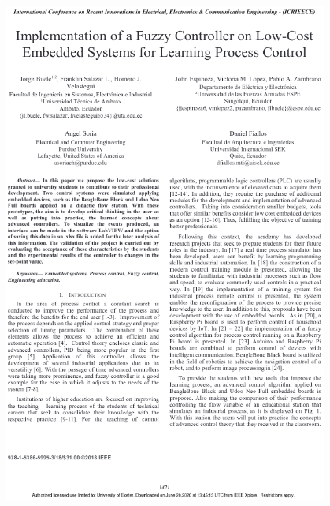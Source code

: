 \begin{figure}[ht]
    \centering
    \includegraphics[width=0.95\textwidth]{5.-Publicaciones/Certificados/4.png}
\end{figure}


